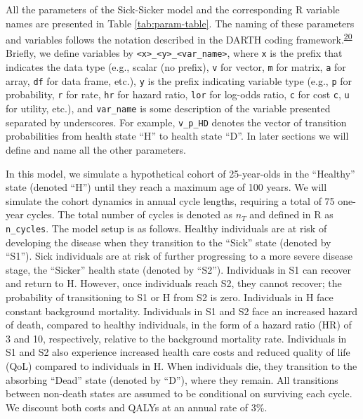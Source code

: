 \documentclass[
]{article}
\begin{document}
All the parameters of the Sick-Sicker model and the corresponding R variable names are presented in Table \ref{tab:param-table}. The naming of these parameters and variables follows the notation described in the DARTH coding framework.\textsuperscript{\protect\hyperlink{ref-Alarid-Escudero2019e}{20}} Briefly, we define variables by \texttt{\textless{}x\textgreater{}\_\textless{}y\textgreater{}\_\textless{}var\_name\textgreater{}}, where \texttt{x} is the prefix that indicates the data type (e.g., scalar (no prefix), \texttt{v} for vector, \texttt{m} for matrix, \texttt{a} for array, \texttt{df} for data frame, etc.), \texttt{y} is the prefix indicating variable type (e.g., \texttt{p} for probability, \texttt{r} for rate, \texttt{hr} for hazard ratio, \texttt{lor} for log-odds ratio, \texttt{c} for cost \texttt{c}, \texttt{u} for utility, etc.), and \texttt{var\_name} is some description of the variable presented separated by underscores. For example, \texttt{v\_p\_HD} denotes the vector of transition probabilities from health state ``H'' to health state ``D''. In later sections we will define and name all the other parameters.

In this model, we simulate a hypothetical cohort of 25-year-olds in the ``Healthy'' state (denoted ``H'') until they reach a maximum age of 100 years. We will simulate the cohort dynamics in annual cycle lengths, requiring a total of 75 one-year cycles. The total number of cycles is denoted as \(n_T\) and defined in R as \texttt{n\_cycles}. The model setup is as follows. Healthy individuals are at risk of developing the disease when they transition to the ``Sick'' state (denoted by ``S1''). Sick individuals are at risk of further progressing to a more severe disease stage, the ``Sicker'' health state (denoted by ``S2''). Individuals in S1 can recover and return to H. However, once individuals reach S2, they cannot recover; the probability of transitioning to S1 or H from S2 is zero. Individuals in H face constant background mortality. Individuals in S1 and S2 face an increased hazard of death, compared to healthy individuals, in the form of a hazard ratio (HR) of 3 and 10, respectively, relative to the background mortality rate. Individuals in S1 and S2 also experience increased health care costs and reduced quality of life (QoL) compared to individuals in H. When individuals die, they transition to the absorbing ``Dead'' state (denoted by ``D''), where they remain. All transitions between non-death states are assumed to be conditional on surviving each cycle. We discount both costs and QALYs at an annual rate of 3\%.
\end{document}
